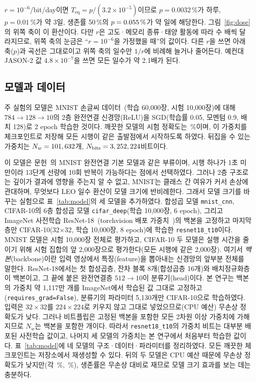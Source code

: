 \documentclass[11pt,a4paper]{article}
\newcommand{\code}[1]{\texttt{#1}}
\newcounter{example}
\begin{document}
\begin{example}
$r=10^{-6}$/bit/day이면 $T_{\mathrm{eq}}=p/(3.2\times10^{-5})$이므로 $p=0.0032\,\%$가 하루, $p=0.01\,\%$가 약 3일, 생존률 50\,\%의 $p=0.055\,\%$가 약 \PhalfNoneDays{}일에 해당한다. 그림~\ref{fig:dose}의 위쪽 축이 이 환산이다. 다만 $r$은 고도·메모리 종류·태양 활동에 따라 수 배씩 달라지므로, 위쪽 축의 눈금은 ``$r=10^{-6}$을 가정했을 때''의 값이다. 다른 $r$을 쓰면 아래 축($p$)과 곡선은 그대로이고 위쪽 축의 일수만 $1/r$에 비례해 늘거나 줄어든다. 예컨대 JASON-2 값 $4.8\times10^{-7}$을 쓰면 모든 일수가 약 2.1배가 된다.
\end{example}

\subsection{모델과 데이터}
주 실험의 모델은 MNIST 손글씨 데이터~\citep{lecun1998}(학습 60{,}000장, 시험 10{,}000장)에 대해 $784\to128\to10$의 2층 완전연결 신경망(ReLU)을 SGD(학습률 0.05, 모멘텀 0.9, 배치 128)로 2 epoch 학습한 것이다. 깨끗한 모델의 시험 정확도는 \CleanAcc{}\,\%이며, 이 가중치를 체크포인트로 저장해 모든 시행이 같은 출발점에서 시작하도록 하였다. 뒤집을 수 있는 가중치는 $N_w=101,632{}$개, $N_{\mathrm{bits}}=3,252,224{}$비트이다.

이 모델은 문헌~\citep{hong2019}의 MNIST 완전연결 기본 모델과 같은 부류이며, 시행 하나가 1초 미만이라 13단계 선량에 10회 반복이 가능하다는 점에서 선택하였다. 그러나 2층 구조로는 깊이가 결과에 영향을 주는지 알 수 없고, MNIST는 클래스 간 여유가 커서 손상에 관대하며, 무엇보다 LEO 일수 환산이 모델 크기에 반비례한다. 그래서 모델 크기를 바꾸는 실험으로 표~\ref{tab:model}의 세 모델을 추가하였다. 합성곱 모델 \code{mnist\_cnn}, CIFAR-10의 6층 합성곱 모델 \code{cifar\_deep}(학습 10{,}000장, 6 epoch), 그리고 ImageNet 사전학습 ResNet-18~\citep{he2016}(torchvision 배포 가중치~\citep{torchvision})의 백본을 고정하고 마지막 층만 CIFAR-10(32$\times$32, 학습 10{,}000장, 8 epoch)에 학습한 \code{resnet18\_t10}이다. MNIST 모델은 시험 10{,}000장 전체로 평가하고, CIFAR-10 두 모델은 실행 시간을 줄이기 위해 시험 집합의 앞 2{,}000장으로 평가한다(모든 시행에 같은 2{,}000장). 여기서 \emph{백본}(backbone)이란 입력 영상에서 특징(feature)을 뽑아내는 신경망의 앞부분 전체를 말한다. ResNet-18에서는 첫 합성곱층, 잔차 블록 8개(합성곱층 16개)와 배치정규화층이 백본이고, 그 끝에 붙은 완전연결층 $512\to10$이 분류기(head)이다. 본 연구는 백본의 가중치 약 1{,}117만 개를 ImageNet에서 학습된 값 그대로 고정하고(\code{requires\_grad=False}), 분류기의 파라미터 5{,}130개만 CIFAR-10으로 학습하였다. 입력은 $32\times32$를 $224\times224$로 키우지 않고 그대로 넣었으므로(CPU 예산) 무손상 정확도가 낮다. 그러나 비트플립은 고정된 백본을 포함한 모든 2차원 이상 가중치에 가해지므로 $N_w$는 백본을 포함한 \NwResnet{}개이다. 따라서 \code{resnet18\_t10}의 가중치 비트는 대부분 배포된 사전학습 값이고, 나머지 세 모델의 가중치는 본 연구에서 처음부터 학습한 값이다. 표~\ref{tab:model}에 네 모델의 구조·데이터·파라미터를 정리하였다. 모든 깨끗한 체크포인트는 저장소에서 재생성할 수 있다. 뒤의 두 모델은 CPU 예산 때문에 무손상 정확도가 낮지만(각 \CleanCifar{}\,\%, \CleanResnet{}\,\%), 생존률은 무손상 대비로 재므로 모델 크기 효과를 보는 데는 충분하다.
\end{document}
